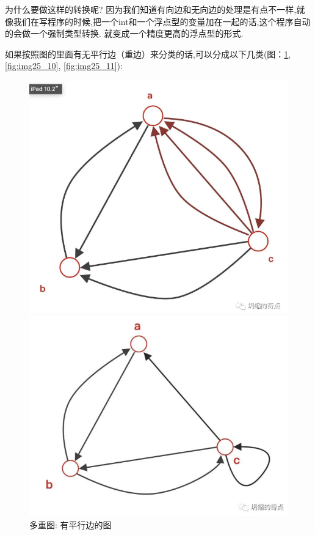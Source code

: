为什么要做这样的转换呢? 因为我们知道有向边和无向边的处理是有点不一样,就像我们在写程序的时候,把一个int和一个浮点型的变量加在一起的话,这个程序自动的会做一个强制类型转换. 就变成一个精度更高的浮点型的形式. 

如果按照图的里面有无平行边（重边）来分类的话,可以分成以下几类(图：\ref{fig:img25_9}, \ref{fig:img25_10}, \ref{fig:img25_11}): 

\begin{figure}[ht]
  \centering
  \begin{minipage}[t]{0.3\textwidth}
    \includegraphics[width=\textwidth]{asset/20231227145235.png}
    \caption{多重图: 有平行边的图}
    \label{fig:img25_9}
  \end{minipage}%
  \hspace{0.5em}
  \begin{minipage}[t]{0.3\textwidth}
    \includegraphics[width=\textwidth]{asset/20231227145249.png}

\end{minipage}
\end{figure}
